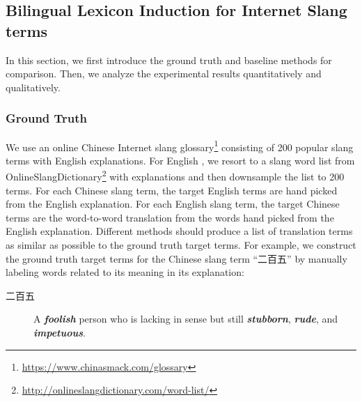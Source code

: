 \subsection{Bilingual Lexicon Induction for Internet Slang terms}
\label{sec:bleis}
In this section, we first introduce the ground truth and baseline methods for comparison. Then, we analyze the experimental results quantitatively and qualitatively.

\subsubsection{Ground Truth}
We use an online Chinese Internet slang glossary\footnote{{\url{https://www.chinasmack.com/glossary}}} consisting of  200 popular slang terms with English explanations. For English , we resort to a slang word list from OnlineSlangDictionary\footnote{{\url{http://onlineslangdictionary.com/word-list/}}} with explanations and then downsample the list to 200 terms.
For each Chinese slang term, the target English terms are hand picked 
from the English explanation. For each English slang term, the target
Chinese terms are the word-to-word translation from the words hand picked
from the English explanation.
Different methods should produce a list of translation terms 
as similar as possible to the ground truth target terms.
For example, we construct the ground truth target terms for 
the Chinese slang term ``二百五'' by manually labeling words related 
to its meaning in its explanation:
\begin{description}
	\item[二百五] A \textbf{\textit{foolish}} person who is lacking in sense but still \textbf{\textit{stubborn}}, \textbf{\textit{rude}}, and \textbf{\textit{impetuous}}.
\end{description}


